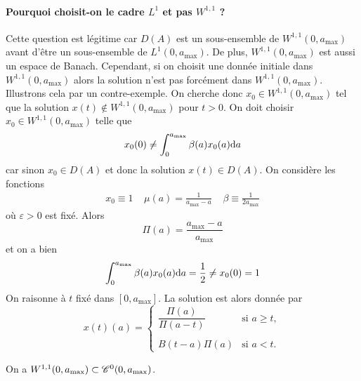 \paragraph{Pourquoi choisit-on le cadre $L^1$ et pas $W^{1,1}$ ?} Cette question est légitime car $D(A)$ est un sous-ensemble de $W^{1,1}(0,a_{\max})$ avant d'être un sous-ensemble de $L^1(0,a_{\max})$. De plus, $W^{1,1}(0,a_{\max})$ est aussi un espace de Banach. Cependant, si on choisit une donnée initiale dans $W^{1,1}(0,a_{\max})$ alors la solution n'est pas forcément dans $W^{1,1}(0,a_{\max})$. Illustrons cela par un contre-exemple. On cherche donc $x_0 \in W^{1,1}(0,a_{\max})$ tel que la solution $x(t) \notin W^{1,1}(0,a_{\max})$ pour $t>0$. On doit choisir $x_0 \in W^{1,1}(0,a_{\max})$ telle que 
\begin{equation*}
    x_0(0) \neq \int_0^{a_{\max}}\beta(a)x_0(a)\mathrm{d} a
\end{equation*}
car sinon $x_0 \in D(A)$ et donc la solution $x(t) \in D(A)$. On considère les fonctions 
\begin{eqnarray*}
    x_0 \equiv 1 \ \ \ \ \ \mu(a) = \frac{1}{a_{\max}-a} \ \ \ \ \ \beta \equiv \frac{1}{2a_{\max}}
\end{eqnarray*}
où $\varepsilon>0$ est fixé. Alors 
\begin{equation*}
    \Pi(a) = \frac{a_{\max}-a}{a_{\max}}
\end{equation*}
et on a bien 
\begin{equation*}
    \int_0^{a_{\max}}\beta(a)x_0(a)\mathrm{d} a = \frac{1}{2} \neq x_0(0)=1
\end{equation*}
On raisonne à $t$ fixé dans $[0,a_{\max}]$. La solution est alors donnée par 
\begin{equation*}
    x(t)(a) = \left\{\begin{array}{cl}
        \dfrac{\Pi(a)}{\Pi(a-t)} & \text{si } a \geq t, \\
        & \\
        B(t-a)\Pi(a) & \text{si } a < t.
    \end{array}\right.
\end{equation*}

\begin{lemme}\label{lem_injec_W_C}
    On a $W^{1,1}(0,a_{\max}) \subset \mathscr{C}^0(0,a_{\max})$.
\end{lemme}

